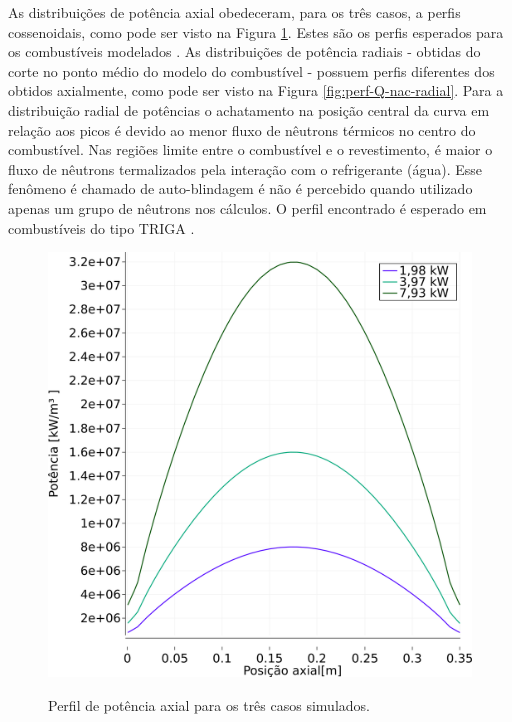 As distribuições de potência axial obedeceram, para os três casos, a perfis
cossenoidais, como pode ser visto na Figura \ref{fig:perf-nac-axial}. Estes são os perfis esperados para
os combustíveis modelados \cite{Veloso2005}. As distribuições de potência radiais -
obtidas do corte no ponto médio do modelo do combustível - possuem perfis diferentes
dos obtidos axialmente, como pode ser visto na Figura \ref{fig:perf-Q-nac-radial}. 
Para a distribuição radial de potências o achatamento na posição central
da curva em relação aos picos é devido ao menor fluxo de nêutrons térmicos no centro do combustível. Nas regiões limite
entre o combustível e o revestimento, é maior o fluxo de nêutrons termalizados pela interação com o refrigerante (água).
Esse fenômeno é chamado de auto-blindagem é não é percebido quando utilizado apenas um grupo
de nêutrons nos cálculos. O perfil encontrado é esperado em combustíveis do tipo TRIGA \cite{Ravnik1990}.

\begin{figure}[htb]
  \caption{Perfil de potência axial para os três casos simulados.}
  \centering\includegraphics[scale=0.5]{figuras/Q_all_NC_port.png}
  \label{fig:perf-nac-axial}
\end{figure}

